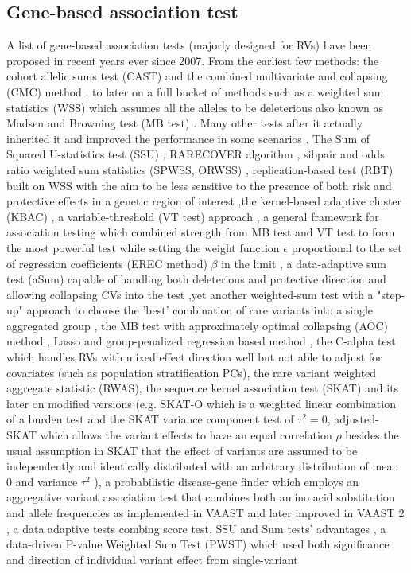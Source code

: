 \documentclass[12pt]{article}
\begin{document}
\subsection*{Gene-based association test}
A list of gene-based association tests (majorly designed for RVs) have been proposed in recent years ever since 2007. From the earliest few methods: the cohort allelic sums test (CAST)\cite{Morgenthaler2007} and the combined multivariate and collapsing (CMC) method \cite{Li2008}, to later on a full bucket of methods such as a weighted sum statistics (WSS) which assumes all the alleles to be deleterious also known as Madsen and Browning test (MB test) \cite{Madsen2009}. Many other tests after it actually inherited it and improved the performance in some scenarios \cite{Hoffmann2010,Zhang2010,Ionita-Laza2011,Feng2011}. The Sum of Squared U-statistics test (SSU) \cite{Pan2009}, RARECOVER algorithm \cite{Bhatia2010}, sibpair and odds ratio weighted sum statistics (SPWSS, ORWSS) \cite{Zhu2010,Feng2011}, replication-based test (RBT) built on WSS with the aim to be less sensitive to the presence of both risk and protective effects in a genetic region of interest \cite{Ionita-Laza2011},the kernel-based adaptive cluster (KBAC) \cite{Liu2010}, a variable-threshold (VT test) approach \cite{Price2010}, a general framework for association testing which combined strength from MB test and VT test to form the most powerful test while setting the weight function $\epsilon$ proportional to the set of regression coefficients (EREC method) $\beta$ in the limit \cite{Lin2011},  a data-adaptive sum test (aSum) capable of handling both deleterious and protective direction and allowing collapsing CVs into the test \cite{Han2010},yet another weighted-sum test with a "step-up" approach to choose the 'best' combination of rare variants into a single aggregated group \cite{Hoffmann2010}, the MB test with approximately optimal collapsing (AOC) method \cite{Zhang2010}, Lasso and group-penalized regression based method \cite{Zhou2010}, the C-alpha test which handles RVs with mixed effect direction well but not able to adjust for covariates (such as population stratification PCs)\cite{Neale2011}, the rare variant weighted aggregate statistic (RWAS)\cite{Sul2011}, the sequence kernel association test (SKAT)\cite{Wu2011} and its later on modified versions (e.g. SKAT-O which is a weighted linear combination of a burden test and the SKAT variance component test of $\tau^2 = 0$, adjusted-SKAT which allows the variant effects to have an equal correlation $\rho$ besides the usual assumption in SKAT that the effect of variants are assumed to be independently and identically distributed with an arbitrary distribution of mean 0 and variance $\tau^2$  )\cite{Ionita-Laza2013,Oualkacha2013,Lee2012,Lee2012a}, a probabilistic disease-gene finder which employs an aggregative variant association test that combines both amino acid substitution and allele frequencies as implemented in VAAST \cite{Yandell2011} and later improved in VAAST 2 \cite{Hu2013}, a data adaptive tests combing score test, SSU and Sum tests' advantages \cite{Pan2011}, a data-driven P-value Weighted Sum Test (PWST) which used both significance and direction of individual variant effect from single-variant 
\end{document}
